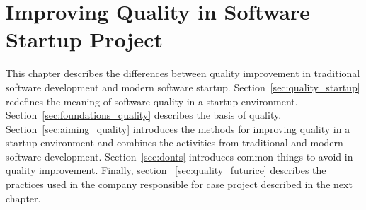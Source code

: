 
 \chapter{Improving Quality in Software Startup Project}

This chapter describes the differences between quality improvement in traditional software development and modern software startup. Section~\ref{sec:quality_startup} redefines the meaning of software quality in a startup environment. Section~\ref{sec:foundations_quality} describes the basis of quality. Section~\ref{sec:aiming_quality} introduces the methods for improving quality in a startup environment and combines the activities from traditional and modern software development. Section~\ref{sec:donts} introduces common things to avoid in quality improvement. Finally, section ~\ref{sec:quality_futurice} describes the practices used in the company responsible for case project described in the next chapter.




